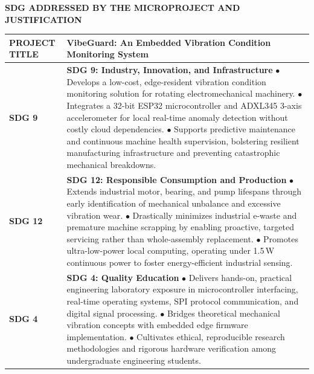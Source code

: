 \begin{center}
\textbf{\fontsize{15}{28}\selectfont SDG ADDRESSED BY THE MICROPROJECT AND JUSTIFICATION}
\end{center}
\vspace{1em}

\begin{table}[H]
\centering
\renewcommand{\arraystretch}{1.4}
\begin{tabular}{|p{3.2cm}|p{12.2cm}|}
\hline
\textbf{PROJECT TITLE} & \textbf{VibeGuard: An Embedded Vibration Condition Monitoring System} \\
\hline
\textbf{SDG 9} & \textbf{SDG 9: Industry, Innovation, and Infrastructure} \newline
$\bullet$ Develops a low-cost, edge-resident vibration condition monitoring solution for rotating electromechanical machinery. \newline
$\bullet$ Integrates a 32-bit ESP32 microcontroller and ADXL345 3-axis accelerometer for local real-time anomaly detection without costly cloud dependencies. \newline
$\bullet$ Supports predictive maintenance and continuous machine health supervision, bolstering resilient manufacturing infrastructure and preventing catastrophic mechanical breakdowns. \\
\hline
\textbf{SDG 12} & \textbf{SDG 12: Responsible Consumption and Production} \newline
$\bullet$ Extends industrial motor, bearing, and pump lifespans through early identification of mechanical unbalance and excessive vibration wear. \newline
$\bullet$ Drastically minimizes industrial e-waste and premature machine scrapping by enabling proactive, targeted servicing rather than whole-assembly replacement. \newline
$\bullet$ Promotes ultra-low-power local computing, operating under 1.5\,W continuous power to foster energy-efficient industrial sensing. \\
\hline
\textbf{SDG 4} & \textbf{SDG 4: Quality Education} \newline
$\bullet$ Delivers hands-on, practical engineering laboratory exposure in microcontroller interfacing, real-time operating systems, SPI protocol communication, and digital signal processing. \newline
$\bullet$ Bridges theoretical mechanical vibration concepts with embedded edge firmware implementation. \newline
$\bullet$ Cultivates ethical, reproducible research methodologies and rigorous hardware verification among undergraduate engineering students. \\
\hline
\end{tabular}
\end{table}
\clearpage
